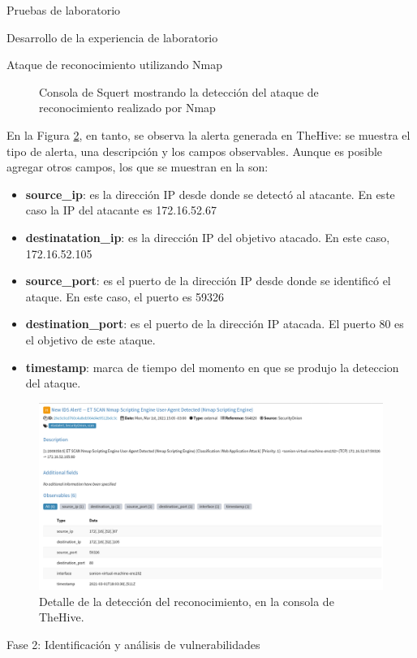 \begin{section}{Pruebas de laboratorio}
\begin{subsection}{Desarrollo de la experiencia de laboratorio}
\begin{subsubsection}{Ataque de reconocimiento utilizando Nmap}
\begin{figure}[H]
    \caption{Consola de Squert mostrando la detección del ataque de reconocimiento realizado por Nmap}
    \label{fig:squert_nmap}
    \end{figure}
    \FloatBarrier 
    En la Figura \ref{fig:thehive_nmap}, en tanto, se observa la alerta generada en TheHive: se muestra el tipo de alerta, una descripción y los campos observables. Aunque es posible agregar otros campos, los que se muestran en la  son:
    \begin{itemize}
        \item \textbf{source\_ip}: es la dirección IP desde donde se detectó al atacante. En este caso la IP del atacante es 172.16.52.67
        \item \textbf{destinatation\_ip}: es la dirección IP del objetivo atacado. En este caso, 172.16.52.105
        \item \textbf{source\_port}: es el puerto de la dirección IP desde donde se identificó el ataque. En este caso, el puerto es 59326
        \item \textbf{destination\_port}: es el puerto de la dirección IP atacada. El puerto 80 es el objetivo de este ataque.
        \item \textbf{timestamp}: marca de tiempo del momento en que se produjo la deteccion del ataque.
    \end{itemize}
    \begin{figure}[H]
    \centering
    \includegraphics[width=1\textwidth]{./iteracion_3_imagenes/TheHive-NMAP.png}
    \caption{Detalle de la detección del reconocimiento, en la consola de TheHive.}
    \label{fig:thehive_nmap}
    \end{figure}
    \FloatBarrier 
    \end{subsubsection}
    \begin{subsubsection} {Fase 2: Identificación y análisis de vulnerabilidades}

\end{subsubsection}
\end{subsection}
\end{section}
